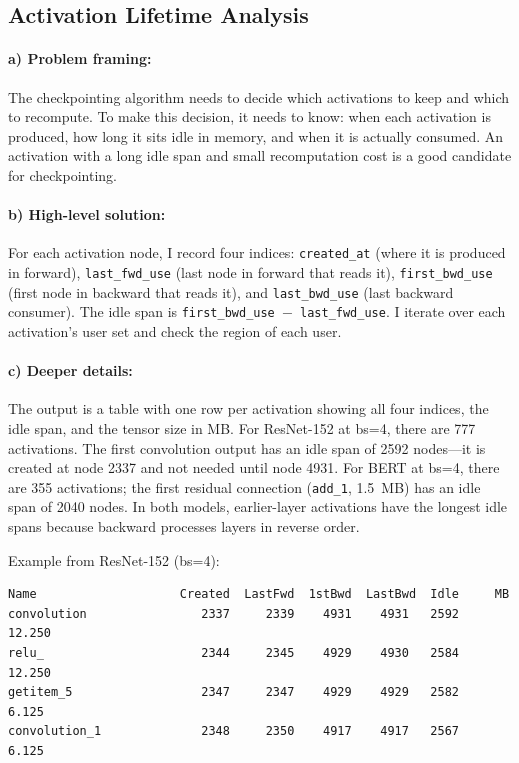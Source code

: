 \documentclass[11pt]{article}
\begin{document}
\subsection{Activation Lifetime Analysis}

\paragraph{a) Problem framing:} The checkpointing algorithm needs to decide which activations to keep and which to recompute. To make this decision, it needs to know: when each activation is produced, how long it sits idle in memory, and when it is actually consumed. An activation with a long idle span and small recomputation cost is a good candidate for checkpointing.

\paragraph{b) High-level solution:} For each activation node, I record four indices: \texttt{created\_at} (where it is produced in forward), \texttt{last\_fwd\_use} (last node in forward that reads it), \texttt{first\_bwd\_use} (first node in backward that reads it), and \texttt{last\_bwd\_use} (last backward consumer). The idle span is \texttt{first\_bwd\_use $-$ last\_fwd\_use}. I iterate over each activation's user set and check the region of each user.

\paragraph{c) Deeper details:} The output is a table with one row per activation showing all four indices, the idle span, and the tensor size in MB. For ResNet-152 at bs=4, there are 777 activations. The first convolution output has an idle span of 2592 nodes---it is created at node 2337 and not needed until node 4931. For BERT at bs=4, there are 355 activations; the first residual connection (\texttt{add\_1}, 1.5~MB) has an idle span of 2040 nodes. In both models, earlier-layer activations have the longest idle spans because backward processes layers in reverse order.

Example from ResNet-152 (bs=4):
\begin{lstlisting}
Name                    Created  LastFwd  1stBwd  LastBwd  Idle     MB
convolution                2337     2339    4931    4931   2592  12.250
relu_                      2344     2345    4929    4930   2584  12.250
getitem_5                  2347     2347    4929    4929   2582   6.125
convolution_1              2348     2350    4917    4917   2567   6.125
\end{lstlisting}
\end{document}
